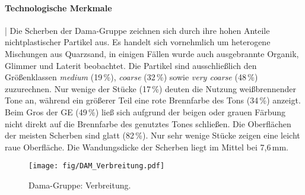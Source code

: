 \paragraph{Technologische Merkmale}\hspace{-.5em}|\hspace{.5em}%
Die Scherben der Dama-Gruppe zeichnen sich durch ihre hohen Anteile nichtplastischer Partikel aus. Es handelt sich vornehmlich um heterogene Mischungen aus Quarzsand, in einigen Fällen wurde auch ausgebrannte Organik, Glimmer und Laterit beobachtet. Die Partikel sind ausschließlich den Größenklassen \textit{medium} (19\,\%), \textit{coarse} (32\,\%) sowie \textit{very coarse} (48\,\%) zuzurechnen. Nur wenige der Stücke (17\,\%) deuten die Nutzung weißbrennender Tone an, während ein größerer Teil eine rote Brennfarbe des Tons (34\,\%) anzeigt. Beim Gros der GE (49\,\%) ließ sich aufgrund der beigen oder grauen Färbung nicht direkt auf die Brennfarbe des genutztes Tones schließen. Die Oberflächen der meisten Scherben sind glatt (82\,\%). Nur sehr wenige Stücke zeigen eine leicht raue Oberfläche. Die Wandungsdicke der Scherben liegt im Mittel bei 7,6\,mm.

\begin{figure*}[p]
	\centering
	\texttt{[image: fig/DAM\_Verbreitung.pdf]}
	\caption{Dama-Gruppe: Verbreitung.}
	\label{fig:DAM_Verbreitung}
\end{figure*}

